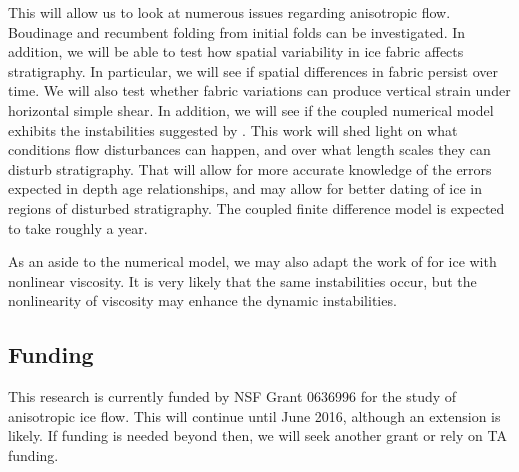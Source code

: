 \documentclass{article}
\begin{document}
This will allow us to look at numerous issues regarding anisotropic flow. Boudinage and recumbent folding from initial folds can be investigated. In addition, we will be able to test how spatial variability in ice fabric affects stratigraphy. In particular, we will see if spatial differences in fabric persist over time. We will also test whether fabric variations can produce vertical strain under horizontal simple shear. In addition, we will see if the coupled numerical model exhibits the instabilities suggested by \citet{montgomery-smith2011}. This work will shed light on what conditions flow disturbances can happen, and over what length scales they can disturb stratigraphy. That will allow for more accurate knowledge of the errors expected in depth age relationships, and may allow for better dating of ice in regions of disturbed stratigraphy. The coupled finite difference model is expected to take roughly a year.

As an aside to the numerical model, we may also adapt the work of \citet{montgomery-smith2001} for ice with nonlinear viscosity. It is very likely that the same instabilities occur, but the nonlinearity of viscosity may enhance the dynamic instabilities.

\subsection{Funding}
This research is currently funded by NSF Grant 0636996 for the study of anisotropic ice flow. This will continue until June 2016, although an extension is likely. If funding is needed beyond then, we will seek another grant or rely on TA funding. 



\end{document}
